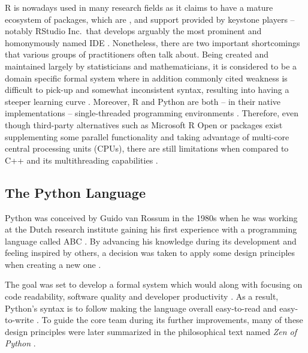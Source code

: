 R is nowadays used in many research fields as it claims to have a mature ecosystem of packages, which are , and support provided by keystone players -- notably RStudio Inc.\ that develops arguably the most prominent and homonymously named \ac{IDE} \parencite[244]{German2013TheEcosystem}.
Nonetheless, there are two important shortcomings that various groups of practitioners often talk about.
Being created and maintained largely by statisticians and mathematicians, it is considered to be a domain specific formal system where in addition commonly cited weakness is difficult to pick-up and somewhat inconsistent syntax, resulting into having a steeper learning curve \parencites{LearningCurveR2010}{HarderToLearn2017}.
Moreover, R and Python are both -- in their native implementations -- single-threaded programming environments \parencite{SimonBGDRAMR2016}.
Therefore, even though third-party alternatives such as Microsoft R Open or packages exist supplementing some parallel functionality and taking advantage of multi-core central processing units (\acp{CPU}), there are still limitations when compared to C++ and its multithreading capabilities \parencite{limrperf2015}.

\subsection{The Python Language}
\label{pylang}
Python was conceived by Guido van Rossum in the 1980s when he was working at the Dutch research institute gaining his first experience with a programming language called ABC \parencites{Perez2011Python:Computing}{BillVenners2003TheRossum}.
By advancing his knowledge during its development and feeling inspired by others, a decision was taken to apply some design principles when creating a new one \parencite{TimPeters2004ThePython}.

The goal was set to develop a formal system which would  along with focusing on code readability, software quality and developer productivity \parencites{BillVenners2003TheRossum}{Sanner1999Python:Development}{Lutz2013}.
As a result, Python's syntax is  to follow making the language overall easy-to-read and easy-to-write \parencites[3]{Sanner1999Python:Development}.
To guide the core team during its further improvements, many of these design principles were later summarized in the philosophical text named \emph{Zen of Python} \parencite{TimPeters2004ThePython}.

